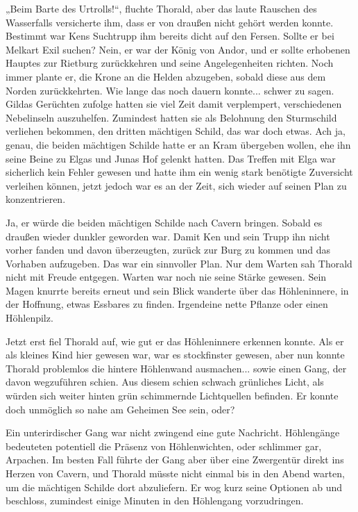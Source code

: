 „Beim Barte des Urtrolls!“, fluchte Thorald, aber das laute Rauschen des Wasserfalls versicherte ihm, dass er von draußen nicht gehört werden konnte. Bestimmt war Kens Suchtrupp ihm bereits dicht auf den Fersen. Sollte er bei Melkart Exil suchen? Nein, er war der König von Andor, und er sollte erhobenen Hauptes zur Rietburg zurückkehren und seine Angelegenheiten richten. Noch immer plante er, die Krone an die Helden abzugeben, sobald diese aus dem Norden zurückkehrten. Wie lange das noch dauern konnte... schwer zu sagen. Gildas Gerüchten zufolge hatten sie viel Zeit damit verplempert, verschiedenen Nebelinseln auszuhelfen. Zumindest hatten sie als Belohnung den Sturmschild verliehen bekommen, den dritten mächtigen Schild, das war doch etwas. Ach ja, genau, die beiden mächtigen Schilde hatte er an Kram übergeben wollen, ehe ihn seine Beine zu Elgas und Junas Hof gelenkt hatten. Das Treffen mit Elga war sicherlich kein Fehler gewesen und hatte ihm ein wenig stark benötigte Zuversicht verleihen können, jetzt jedoch war es an der Zeit, sich wieder auf seinen Plan zu konzentrieren.

Ja, er würde die beiden mächtigen Schilde nach Cavern bringen. Sobald es draußen wieder dunkler geworden war. Damit Ken und sein Trupp ihn nicht vorher fanden und davon überzeugten, zurück zur Burg zu kommen und das Vorhaben aufzugeben. Das war ein sinnvoller Plan. Nur dem Warten sah Thorald nicht mit Freude entgegen. Warten war noch nie seine Stärke gewesen. Sein Magen knurrte bereits erneut und sein Blick wanderte über das Höhleninnere, in der Hoffnung, etwas Essbares zu finden. Irgendeine nette Pflanze oder einen Höhlenpilz.

Jetzt erst fiel Thorald auf, wie gut er das Höhleninnere erkennen konnte. Als er als kleines Kind hier gewesen war, war es stockfinster gewesen, aber nun konnte Thorald problemlos die hintere Höhlenwand ausmachen... sowie einen Gang, der davon wegzuführen schien. Aus diesem schien schwach grünliches Licht, als würden sich weiter hinten grün schimmernde Lichtquellen befinden. Er konnte doch unmöglich so nahe am Geheimen See sein, oder?

Ein unterirdischer Gang war nicht zwingend eine gute Nachricht. Höhlengänge bedeuteten potentiell die Präsenz von Höhlenwichten, oder schlimmer gar, Arpachen. Im besten Fall führte der Gang aber über eine Zwergentür direkt ins Herzen von Cavern, und Thorald müsste nicht einmal bis in den Abend warten, um die mächtigen Schilde dort abzuliefern. Er wog kurz seine Optionen ab und beschloss, zumindest einige Minuten in den Höhlengang vorzudringen.

